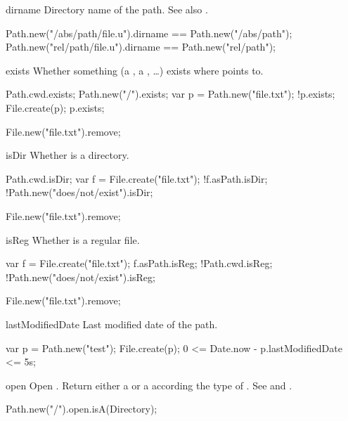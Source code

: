 \begin{urbiscriptapi}
\item[dirname]%
  Directory name of the path.  See also .
\begin{urbiassert}
Path.new("/abs/path/file.u").dirname == Path.new("/abs/path");
Path.new("rel/path/file.u").dirname  == Path.new("rel/path");
\end{urbiassert}


\item[exists]%
  Whether something (a , a , \ldots) exists
  where \this points to.
\begin{urbiassert}
Path.cwd.exists;
Path.new("/").exists;
var p = Path.new("file.txt");
!p.exists;
File.create(p);
p.exists;
\end{urbiassert}
\begin{urbicomment}
File.new("file.txt").remove;
\end{urbicomment}


\item[isDir]%
  Whether \this is a directory.
\begin{urbiassert}
Path.cwd.isDir;
var f = File.create("file.txt");
!f.asPath.isDir;
!Path.new("does/not/exist").isDir;
\end{urbiassert}
\begin{urbicomment}
File.new("file.txt").remove;
\end{urbicomment}


\item[isReg]%
  Whether \this is a regular file.
\begin{urbiassert}
var f = File.create("file.txt");
 f.asPath.isReg;
!Path.cwd.isReg;
!Path.new("does/not/exist").isReg;
\end{urbiassert}
\begin{urbicomment}
File.new("file.txt").remove;
\end{urbicomment}


\item[lastModifiedDate]%
  Last modified date of the path.
\begin{urbiassert}
var p = Path.new("test");
File.create(p);
0 <= Date.now - p.lastModifiedDate <= 5s;
\end{urbiassert}


\item[open] Open \this. Return either a  or a 
  according the type of \this. See  and
  .
\begin{urbiassert}
Path.new("/").open.isA(Directory);
\end{urbiassert}



\end{urbiscriptapi}
